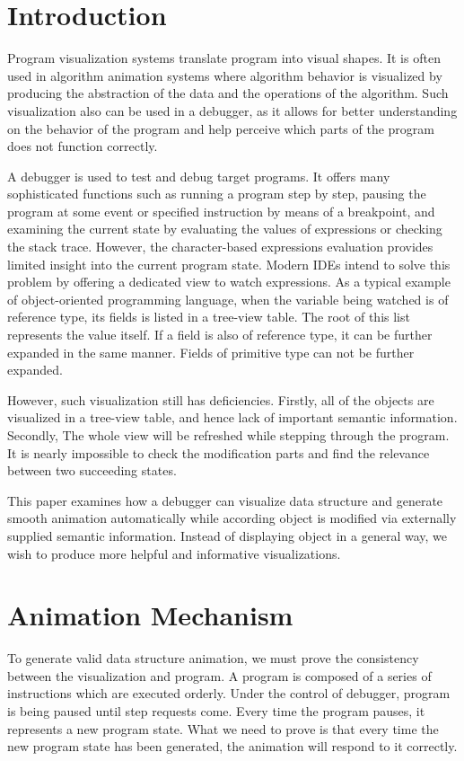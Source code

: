 \documentclass [a4paper,11pt]{article}
\begin{document}
\section {Introduction}

Program visualization systems translate program into visual shapes. It is often used in algorithm animation systems where algorithm behavior is visualized by producing the abstraction of the data and the operations of the algorithm. Such visualization also can be used in a debugger, as it allows for better understanding on the behavior of the program and help perceive which parts of the program does not function correctly.

A debugger is used to test and debug target programs. It offers many sophisticated functions such as running a program step by step, pausing the program at some event or specified instruction by means of a breakpoint, and examining the current state by evaluating the values of expressions or checking the stack trace. However, the character-based expressions evaluation provides limited insight into the current program state. Modern IDEs intend to solve this problem by offering a dedicated view to watch expressions. As a typical example of object-oriented programming language, when the variable being watched is of reference type, its fields is listed in a tree-view table. The root of this list represents the value itself. If a field is also of reference type, it can be further expanded in the same manner. Fields of primitive type can not be further expanded.

However, such visualization still has deficiencies. Firstly, all of the objects are visualized in a tree-view table, and hence lack of important semantic information. Secondly, The whole view will be refreshed while stepping through the program. It is nearly impossible to check the modification parts and find the relevance between two succeeding states.

This paper examines how a debugger can visualize data structure and generate smooth animation automatically while according object is modified via externally supplied semantic information. Instead of displaying object in a general way, we wish to produce more helpful and informative visualizations.

\section {Animation Mechanism}
To generate valid data structure animation, we must prove the consistency between the visualization and program. A program is composed of a series of instructions which are executed orderly. Under the control of debugger, program is being paused until step requests come. Every time the program pauses, it represents a new program state. What we need to prove is that every time the new program state has been generated, the animation will respond to it correctly.
\end{document}

